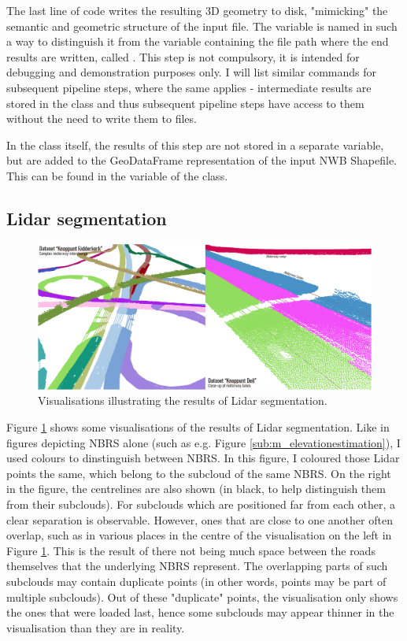The last line of code writes the resulting 3D geometry to disk, "mimicking" the semantic and geometric structure of the input file. The variable is named in such a way to distinguish it from the variable containing the file path where the end results are written, called . This step is not compulsory, it is intended for debugging and demonstration purposes only. I will list similar commands for subsequent pipeline steps, where the same applies - intermediate results are stored in the class and thus subsequent pipeline steps have access to them without the need to write them to files.

In the class itself, the results of this step are not stored in a separate variable, but are added to the GeoDataFrame representation of the input NWB Shapefile. This can be found in the  variable of the  class.

\subsection{Lidar segmentation}
\label{sub:r_lidarsegmentation}

\begin{figure}
    \centering
    \includegraphics[width=0.9\linewidth]{final_report/figs/lidarsegmentation0.png}
    \caption{Visualisations illustrating the results of Lidar segmentation.}
    \label{fig:lidarsegmentation0}
\end{figure}

Figure \ref{fig:lidarsegmentation0} shows some visualisations of the results of Lidar segmentation. Like in figures depicting NBRS alone (such as e.g. Figure \ref{sub:m_elevationestimation}), I used colours to dinstinguish between NBRS. In this figure, I coloured those Lidar points the same, which belong to the subcloud of the same NBRS. On the right in the figure, the centrelines are also shown (in black, to help distinguish them from their subclouds). For subclouds which are positioned far from each other, a clear separation is observable. However, ones that are close to one another often overlap, such as in various places in the centre of the visualisation on the left in Figure \ref{fig:lidarsegmentation0}. This is the result of there not being much space between the roads themselves that the underlying NBRS represent. The overlapping parts of such subclouds may contain duplicate points (in other words, points may be part of multiple subclouds). Out of these "duplicate" points, the visualisation only shows the ones that were loaded last, hence some subclouds may appear thinner in the visualisation than they are in reality.

